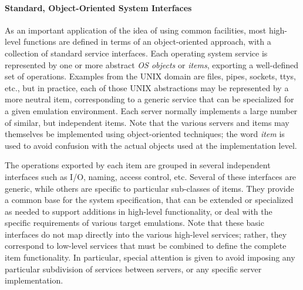 \paragraph{Standard, Object-Oriented System Interfaces}
As an important application of the idea of using common facilities,
most high-level functions are defined in terms of an object-oriented
approach, with a collection of standard service interfaces.  Each
operating system service is represented by one or more abstract {\em
OS objects} or {\em items}, exporting a well-defined set of
operations.  Examples from the UNIX domain are files, pipes, sockets,
ttys, etc., but in practice, each of those UNIX abstractions may be
represented by a more neutral item, corresponding to a generic service
that can be specialized for a given emulation environment.  Each
server normally implements a large number of similar, but independent
items. Note that the various servers and items may themselves be
implemented using object-oriented techniques; the word {\em item} is
used to avoid confusion with the actual objects used at the
implementation level.

The operations exported by each item are grouped in several
independent interfaces such as I/O, naming, access control, etc.
Several of these interfaces are generic, while others are specific to
particular sub-classes of items. They provide a common base for the
system specification, that can be extended or specialized as needed to
support additions in high-level functionality, or deal with the
specific requirements of various target emulations.  Note that these
basic interfaces do not map directly into the various high-level
services; rather, they correspond to low-level services that must be
combined to define the complete item functionality. In particular,
special attention is given to avoid imposing any particular subdivision
of services between servers, or any specific server implementation.


